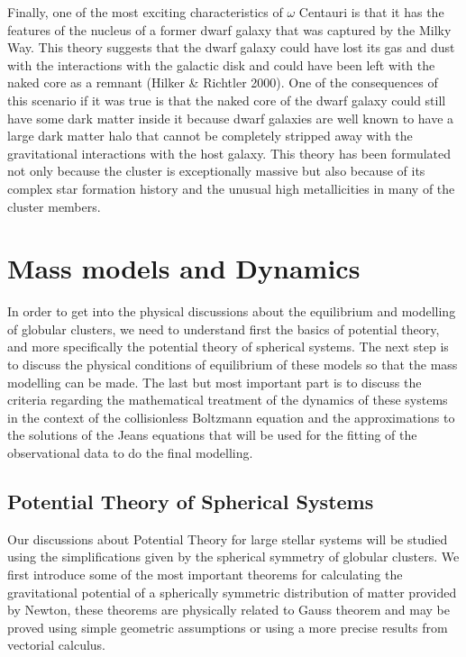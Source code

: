 Finally, one of the most exciting characteristics of $\omega$ Centauri is that it has the features of the nucleus of a former dwarf galaxy that was captured by the Milky Way. This theory suggests that the dwarf galaxy could have lost its gas and dust with the interactions with the galactic disk and could have been left with the naked core as a remnant (Hilker \& Richtler 2000). One of the consequences of this scenario if it was true is that the naked core of the dwarf galaxy could still have some dark matter inside it because dwarf galaxies are well known to have a large dark matter halo that cannot be completely stripped away with the gravitational interactions with the host galaxy. This theory has been formulated not only because the cluster is exceptionally massive but also because of its complex star formation history and the unusual high metallicities in many of the cluster members.

\section{Mass models and Dynamics}

In order to get into the physical discussions about the equilibrium and modelling of globular clusters, we need to understand first the basics of potential theory, and more specifically the potential theory of spherical systems. The next step is to discuss the physical conditions of equilibrium of these models so that the mass modelling can be made. The last but most important part is to discuss the criteria regarding the mathematical treatment of the dynamics of these systems in the context of the collisionless Boltzmann equation and the approximations to the solutions of the Jeans equations that will be used for the fitting of the observational data to do the final modelling.

\subsection{Potential Theory of Spherical Systems}

Our discussions about Potential Theory for large stellar systems will be studied using the simplifications given by the spherical symmetry of globular clusters. We first introduce some of the most important theorems for calculating the gravitational potential of a spherically symmetric distribution of matter provided by Newton, these theorems are physically related to Gauss theorem and may be proved using simple geometric assumptions or using a more precise results from vectorial calculus.

